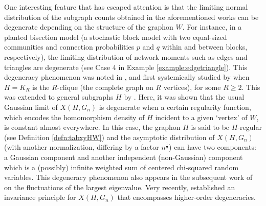 \documentclass[11pt,reqno]{amsart}
\numberwithin{equation}{section}
\theoremstyle{definition}
\begin{document}
One interesting feature that has escaped attention is that the limiting normal distribution of the subgraph counts obtained in the aforementioned works can be degenerate depending on the structure of the graphon $W$. For instance, in a planted bisection model \cite{mossel2016consistency} (a stochastic block model with two equal-sized communities and 
 connection probabilities $p$ and $q$ within and between blocks, respectively),  the limiting distribution of network moments such as edges and triangles are degenerate (see Case 4 in Example \ref{example:edgetriangle}). 
This degeneracy phenomenon was noted in \citet{feray2020graphons}, and first systemically studied by \citet{hladky2019limit} when $H=K_R$ is the $R$-clique (the complete graph on $R$ vertices), for some $R \geq 2$. This was extended to general subgraphs $H$ by \citet{BCJ}. Here, it was shown that the usual Gaussian limit of $X(H, G_n)$ is degenerate when a certain regularity function, which encodes the homomorphism density of $H$ incident to a given `vertex' of $W$, is constant almost everywhere. In this case, the graphon $H$ is said to be $H$-regular (see Definition \ref{defn:tabxyHW}) and the asymptotic distribution of $X(H, G_n)$ (with another normalization, differing by a factor $n^{\frac{1}{2}}$) can have two components: a Gaussian component and another independent (non-Gaussian) component which is a (possibly) infinite weighted sum of centered chi-squared random variables. This degeneracy phenomenon also appears in the subsequent work of \citet{chatterjee2024fluctuation} on the fluctuations of the largest eigenvalue. Very recently, \citet{huang2024gaussian} established an invariance principle for $X(H, G_n)$ that encompasses higher-order degeneracies. 
\end{document}
